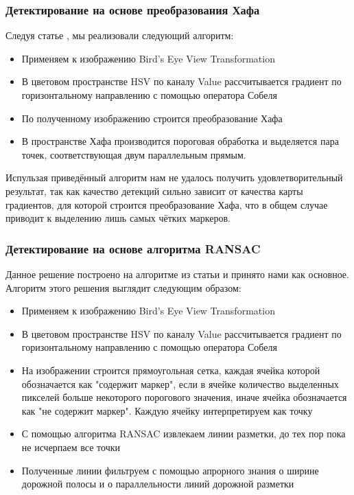 \documentclass[aps,%
14pt,%
final,%
oneside,
onecolumn,%
musixtex, %
superscriptaddress,%
centertags]{extarticle} %
\begin{document}
\subsubsection*{Детектирование на основе преобразования Хафа}
Следуя статье \cite{song2017real}, мы реализовали следующий алгоритм:
\begin{itemize}
    \item Применяем к изображению Bird's Eye View Transformation
    \item В цветовом пространстве HSV по каналу Value рассчитывается градиент по горизонтальному направлению с помощью оператора Собеля
    \item По полученному изображению строится преобразование Хафа
    \item В пространстве Хафа производится пороговая обработка и выделяется пара точек, соответствующая двум параллельным прямым.
\end{itemize}

Испульзая приведённый алгоритм нам не удалось получить удовлетворительный результат, так как качество детекций сильно зависит от качества карты градиентов, для которой строится преобразование Хафа, что в общем случае приводит к выделению лишь самых чётких маркеров.

\subsubsection*{Детектирование на основе алгоритма RANSAC}
Данное решение построено на алгоритме из статьи \cite{aly2008real} и принято нами как основное. Алгоритм этого решения выглядит следующим образом:
\begin{itemize}
    \item Применяем к изображению Bird's Eye View Transformation
    \item В цветовом пространстве HSV по каналу Value рассчитывается градиент по горизонтальному направлению с помощью оператора Собеля
    \item На изображении строится прямоугольная сетка, каждая ячейка которой обозначается как "содержит маркер", если в ячейке количество выделенных пикселей больше некоторого порогового значения, иначе ячейка обозначается как "не содержит маркер". Каждую ячейку интерпретируем как точку
    \item С помощью алгоритма RANSAC извлекаем линии разметки, до тех пор пока не исчерпаем все точки
    \item Полученные линии фильтруем с помощью апрорного знания о ширине дорожной полосы и о параллельности линий дорожной разметки
\end{itemize}
\end{document}
